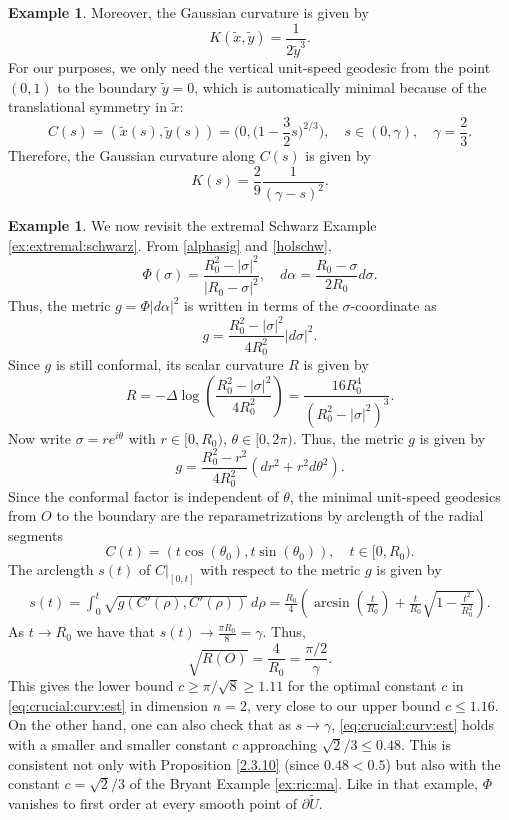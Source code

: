 \documentclass[11pt,reqno]{amsart}
\renewcommand{\leq}{\leqslant}
\renewcommand{\geq}{\geqslant}
\theoremstyle{plain}
\theoremstyle{definition}
\newtheorem{example}[theorem]{Example}
\numberwithin{equation}{section}
\begin{document}
\begin{example}
\noindent Moreover, the Gaussian curvature is given by
$$K(\tilde{x},\tilde{y})=\frac{1}{2\tilde{y}^{3}}.$$
For our purposes, we only need the vertical unit-speed geodesic from the point $(0,1)$ to the boundary $\tilde{y}=0$, which is automatically minimal because of the translational symmetry in $\tilde{x}$:
    $$C(s)=(\tilde{x}(s),\tilde{y}(s)) = \biggl(0,\biggl(1-\frac{3}{2}s\biggr)^{2/3}\biggr),\quad  s\in (0,\gamma), \quad \gamma = \frac{2}{3}.$$
Therefore, the Gaussian curvature along $C(s)$ is given by
$$K(s)=\displaystyle \frac{2}{9}\frac{1}{\left(\gamma-s\right)^2}.$$
\end{example}

\begin{example}\label{ex:schwarz:2}
We now revisit the extremal Schwarz Example \ref{ex:extremal:schwarz}. From \eqref{alphasig} and \eqref{holschw},
$$\Phi(\sigma)=\frac{R_0^2-|\sigma|^2}{|R_0-\sigma|^2}, \quad d\alpha=\frac{R_0-\sigma}{2R_0}d\sigma.$$
Thus, the metric $g = \Phi|d\alpha|^2$ is written in terms of the $\sigma$-coordinate as
$$g=\frac{R_0^2-|\sigma|^2}{4R_0^2}|d\sigma|^2.$$
Since $g$ is still conformal, its scalar curvature $R$ is given by
$$R=-\Delta \log \left(\frac{R_0^2-|\sigma|^2}{4R_0^2}\right)=\frac{16R_0^4}{(R_0^2-|\sigma|^2)^3}.$$
Now write $\sigma=re^{i\theta}$ with $r\in[0,R_0)$, $\theta\in[0,2\pi)$. Thus, the metric $g$ is given by 
$$g=\frac{R_0^2-r^2}{4R_0^2}(dr^2+r^2d\theta^2).$$
Since the conformal factor is independent of $\theta$, the minimal unit-speed geodesics from $O$ to the boundary are the reparametrizations by arclength of the radial segments
$$C(t)=(t\cos(\theta_{0}),t\sin(\theta_{0})), \quad t\in[0,R_0).$$
The arclength $s(t)$ of $C|_{[0,t]}$ with respect to the metric $g$ is given by
$$\begin{array}{ccl}
   s(t)   =  \displaystyle \int_{0}^{t} \sqrt{g(C'(\rho),C'(\rho))} \ d\rho =  \frac{R_0}{4}\left(\arcsin\left(\displaystyle \frac{t}{R_0}\right)+\frac{t}{R_0}\sqrt{ \displaystyle 1-\frac{t^2}{R_0^2}}\right). 
\end{array}$$
As $t\to R_0$ we have that $s(t) \to \frac{\pi R_0}{8} = \gamma$. Thus,
$$\sqrt{R(O)}=\frac{4}{R_0}=\frac{\pi/2}{\gamma}.$$
This gives the lower bound $c \geq \pi/\sqrt{8} \geq 1.11$ for the optimal constant $c$ in \eqref{eq:crucial:curv:est} in dimension $n = 2$, very close to our upper bound $c \leq 1.16$. On the other hand, one can also check that as $s \to \gamma$, \eqref{eq:crucial:curv:est} holds with a smaller and smaller constant $c$ approaching $\sqrt{2}/3 \leq 0.48$. This is consistent not only with Proposition \ref{2.3.10} (since $0.48 < 0.5$) but also with the constant $c = \sqrt{2}/3$ of the Bryant Example \ref{ex:ric:ma}. Like in that example, $\Phi$ vanishes to first order at every smooth point of $\partial \widetilde{U}$.
\end{example}
\end{document}
